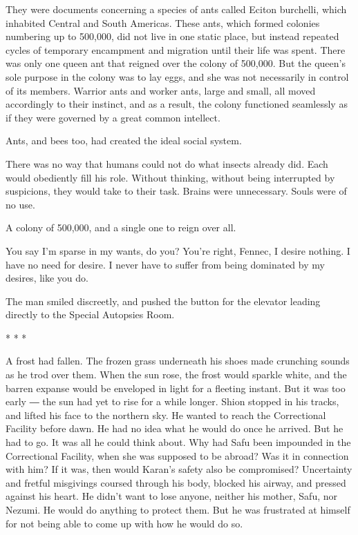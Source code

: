 They were documents concerning a species of ants called Eciton
burchelli, which inhabited Central and South Americas. These ants, which
formed colonies numbering up to 500,000, did not live in one static
place, but instead repeated cycles of temporary encampment and migration
until their life was spent. There was only one queen ant that reigned
over the colony of 500,000. But the queen's sole purpose in the colony
was to lay eggs, and she was not necessarily in control of its members.
Warrior ants and worker ants, large and small, all moved accordingly to
their instinct, and as a result, the colony functioned seamlessly as if
they were governed by a great common intellect.

Ants, and bees too, had created the ideal social system.

There was no way that humans could not do what insects already did. Each
would obediently fill his role. Without thinking, without being
interrupted by suspicions, they would take to their task. Brains were
unnecessary. Souls were of no use.

A colony of 500,000, and a single one to reign over all.

You say I'm sparse in my wants, do you? You're right, Fennec, I desire
nothing. I have no need for desire. I never have to suffer from being
dominated by my desires, like you do.

The man smiled discreetly, and pushed the button for the elevator
leading directly to the Special Autopsies Room.

* * *

A frost had fallen. The frozen grass underneath his shoes made crunching
sounds as he trod over them. When the sun rose, the frost would sparkle
white, and the barren expanse would be enveloped in light for a fleeting
instant. But it was too early ― the sun had yet to rise for a while
longer. Shion stopped in his tracks, and lifted his face to the northern
sky. He wanted to reach the Correctional Facility before dawn. He had no
idea what he would do once he arrived. But he had to go. It was all he
could think about. Why had Safu been impounded in the Correctional
Facility, when she was supposed to be abroad? Was it in connection with
him? If it was, then would Karan's safety also be compromised?
Uncertainty and fretful misgivings coursed through his body, blocked his
airway, and pressed against his heart. He didn't want to lose anyone,
neither his mother, Safu, nor Nezumi. He would do anything to protect
them. But he was frustrated at himself for not being able to come up
with how he would do so.

